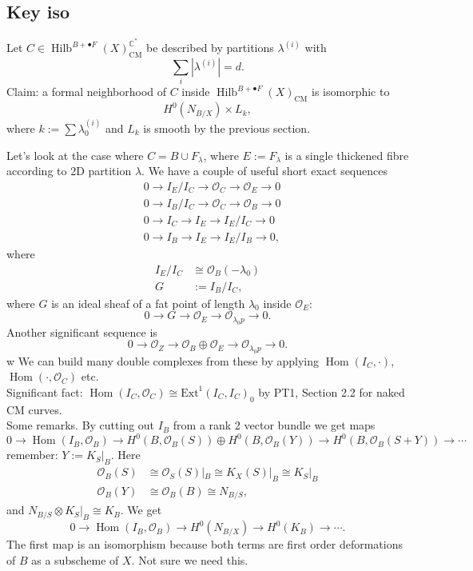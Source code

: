 \documentclass{amsart}
\theoremstyle{definition}
\newcommand{\CC} {\mathbb{C}}          %
\renewcommand{\O}{\mathcal{O}}
\newcommand{\Hom}{\operatorname{Hom}}
\newcommand{\Hilb}{\operatorname{Hilb}}
\newcommand{\CM}{\operatorname{CM}}
\begin{document}
\subsection{Key iso}

Let $C \in \Hilb^{B+\bullet F}(X)^{\CC^*}_{\CM}$ be described by partitions $\lambda^{(i)}$ with
\[
\sum_i |\lambda^{(i)}| = d.
\]
Claim: a formal neighborhood of $C$ inside $\Hilb^{B+\bullet F}(X)_{\CM}$ is isomorphic to 
$$
H^0(N_{B/X}) \times L_{k},
$$
where $k := \sum \lambda_{0}^{(i)}$ and $L_k$ is smooth by the previous section. 


Let's look at the case where $C = B \cup F_{\lambda}$, where $E:=F_\lambda$ is a single thickened fibre according to 2D partition $\lambda$. We have a couple of useful short exact sequences
\begin{align*}
&0 \rightarrow I_E / I_C \rightarrow \O_C \rightarrow \O_E \rightarrow 0 \\
&0 \rightarrow I_B / I_C \rightarrow \O_C \rightarrow \O_B \rightarrow 0 \\
&0 \rightarrow I_C \rightarrow I_E \rightarrow I_E / I_C \rightarrow 0 \\
&0 \rightarrow I_B \rightarrow I_E \rightarrow I_E / I_B \rightarrow 0,
\end{align*}
where 
\begin{align*}
I_E / I_C &\cong \O_B(-\lambda_0) \\
G&:=I_B / I_C,
\end{align*}
where $G$ is an ideal sheaf of a fat point of length $\lambda_0$ inside $\O_{E}$:
\[
0 \rightarrow G \rightarrow \O_E \rightarrow \O_{\lambda_0 p} \rightarrow 0.
\]
Another significant sequence is
\[
0 \rightarrow \O_Z \rightarrow \O_B \oplus \O_E \rightarrow \O_{\lambda_0 p} \rightarrow 0.
\]w
We can build many double complexes from these by applying $\Hom(I_C,\cdot)$, $\Hom(\cdot, \O_C)$ etc.  \\

Significant fact: $\Hom(I_C,\O_C) \cong \mathrm{Ext}^1(I_C,I_C)_0$ by PT1, Section 2.2 for naked CM curves. \\

Some remarks. By cutting out $I_B$ from a rank 2 vector bundle we get maps
\[
0 \rightarrow \Hom(I_B, \O_B) \rightarrow H^0(B,\O_B(S)) \oplus H^0(B,\O_B(Y)) \rightarrow H^0(B,\O_B(S+Y)) \rightarrow \cdots
\]
remember: $Y := K_S|_B$. Here 
\begin{align*}
\O_B(S) &\cong \O_S(S) |_{B} \cong K_X (S) |_B \cong K_S |_B \\
\O_B(Y) &\cong \O_B(B) \cong N_{B/S},
\end{align*}
and $N_{B/S} \otimes K_S|_B \cong K_B$. We get
 \[
0 \rightarrow \Hom(I_B, \O_B) \rightarrow H^0(N_{B/X}) \rightarrow H^0(K_B) \rightarrow \cdots.
\]
The first map is an isomorphism because both terms are first order deformations of $B$ as a subscheme of $X$. Not sure we need this.
 
\end{document}
